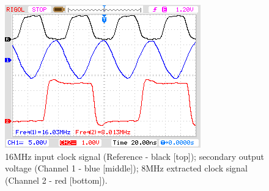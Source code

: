 \documentclass[conference]{IEEEtran}
\begin{document}
	\begin{figure}[t]
		\centering
		\includegraphics[width=0.8\columnwidth]{./img/Clock}
		\caption{16MHz input clock signal (Reference - black [top]); secondary output voltage (Channel 1 - blue [middle]); 8MHz extracted clock signal (Channel 2 - red [bottom]).}
		\label{fig:Clock}
	\end{figure}
	
\end{document}
